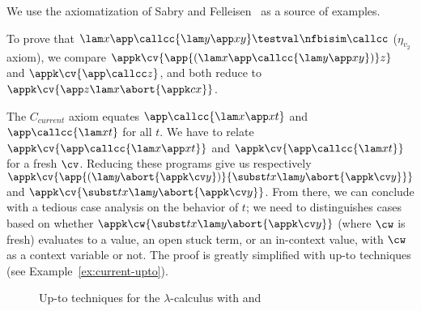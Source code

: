\documentclass{lmcs}
\theoremstyle{defC}
\begin{document}
We use the \textcallcc axiomatization of Sabry and
Felleisen~\cite{Sabry-Felleisen:LFP92} as a source of examples.

\begin{exa}
  To prove that
  $\lam x {\app \callcc {\lam y {\app x y}}} \testval\nfbisim \callcc$
  ($\eta_{v_2}$ axiom), we compare
  $\appk \cv {\app {(\lam x {\app \callcc {\lam y {\app x y}}})} z}$ and
  $\appk \cv {\app \callcc z}$, and both reduce to
  $\appk \cv {\app z {\lam x {\abort {\appk c x}}}}$.
\end{exa}

\begin{exa}%
  \label{ex:current}
  The $C_{current}$ axiom equates $\app \callcc {\lam x {\app x t}}$ and
  $\app \callcc {\lam x t}$ for all $t$. We have to relate
  $\appk \cv {\app \callcc {\lam x {\app x t}}}$ and
  $\appk \cv {\app \callcc {\lam x t}}$ for a fresh $\cv$. Reducing these
  programs give us respectively
  $\appk \cv {\app {(\lam y {\abort {\appk \cv y}})}{\subst t x {\lam y {\abort
          {\appk \cv y}}}}}$ and
  $\appk \cv {\subst t x {\lam y {\abort {\appk \cv y}}}}$. From there, we can
  conclude with a tedious case analysis on the behavior of $t$; we need to
  distinguishes cases based on whether
  $\appk \cw {\subst t x {\lam y {\abort {\appk \cv y}}}}$ (where $\cw$ is
  fresh) evaluates to a value, an open stuck term, or an in-context value, with
  $\cw$ as a context variable or not. The proof is greatly simplified with up-to
  techniques (see Example~\ref{ex:current-upto}).
\end{exa}


\begin{figure}
\caption{Up-to techniques for the $\lambda$-calculus with \textcallcc and \textabort}%
\label{fig:upto-callcc}
\end{figure}
\end{document}
